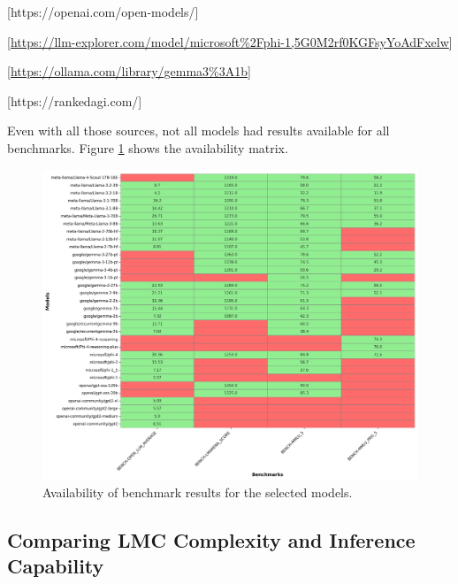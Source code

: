         [https://openai.com/open-models/]

        [\url{https://llm-explorer.com/model/microsoft%2Fphi-1,5G0M2rf0KGFsyYoAdFxelw}]

        [\url{https://ollama.com/library/gemma3%3A1b}]

        [https://rankedagi.com/]


        Even with all those sources, not all models had results available for all benchmarks. Figure \ref{fig:benchmark_availability} shows the availability matrix.

        \begin{figure}[H]
            \includegraphics[width=\linewidth]{img/benchmark_availability.png}
            \caption{Availability of benchmark results for the selected models.}
            \label{fig:benchmark_availability}
        \end{figure}

\subsection{Comparing LMC Complexity and Inference Capability}


